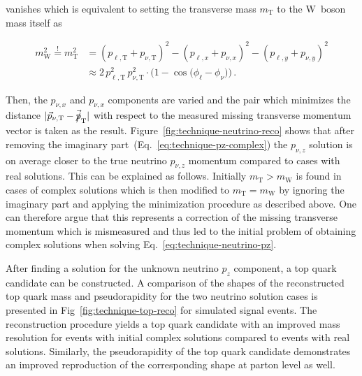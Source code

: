 vanishes which is equivalent to setting the transverse mass $m_\mathrm{T}$ to the W~boson mass itself as

\begin{align}
m_\mathrm{W}^2\overset{!}{=}m_\mathrm{T}^2&=(p_{\ell,\mathrm{T}}+p_{\nu,\mathrm{T}})^2-(p_{\ell,x}+p_{\nu,x})^{2}-(p_{\ell,y}+p_{\nu,y})^{2}\nonumber\\
&\approx2\,p_{\ell,\mathrm{T}}^2\,p_{\nu,\mathrm{T}}^2\cdot\Big(1-\cos\big(\phi_\ell-\phi_\nu\big)\Big)\,.
\end{align}

Then, the $p_{\nu,x}$ and $p_{\nu,x}$ components are varied and the pair which minimizes the distance $|\vec{p}_{\nu,\mathrm{T}}-\vec{\slashed{p}}_\mathrm{T}|$ with respect to the measured missing transverse momentum vector is taken as the result. Figure~\ref{fig:technique-neutrino-reco} shows that after removing the imaginary part~(Eq.~\ref{eq:technique-pz-complex}) the $p_{\nu,z}$ solution is on average closer to the true neutrino $p_{\nu,z}$ momentum compared to cases with real solutions. This can be explained as follows. Initially $m_\mathrm{T}>m_\mathrm{W}$ is found in cases of complex solutions which is then modified to $m_\mathrm{T}=m_\mathrm{W}$ by ignoring the imaginary part and applying the minimization procedure as described above. One can therefore argue that this represents a correction of the missing transverse momentum which is mismeasured and thus led to the initial problem of obtaining complex solutions when solving Eq.~\ref{eq:technique-neutrino-pz}.

After finding a solution for the unknown neutrino $p_{z}$ component, a top quark candidate can be constructed. A comparison of the shapes of the reconstructed top quark mass and pseudorapidity for the two neutrino solution cases is presented in Fig~\ref{fig:technique-top-reco} for simulated signal events. The reconstruction procedure yields a top quark candidate with an improved mass resolution for events with initial complex solutions compared to events with real solutions. Similarly, the pseudorapidity of the top quark candidate demonstrates an improved reproduction of the corresponding shape at parton level as well.

